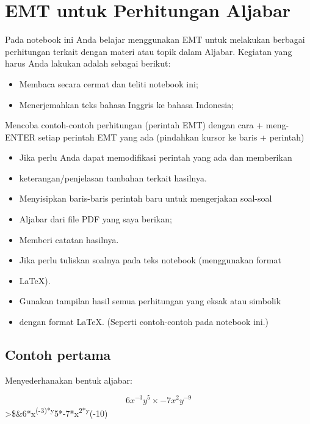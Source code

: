\documentclass[
]{book}
\author{}
\date{}
\begin{document}
\frontmatter

\mainmatter
\chapter{EMT untuk Perhitungan Aljabar}\label{emt-untuk-perhitungan-aljabar}

Pada notebook ini Anda belajar menggunakan EMT untuk melakukan berbagai perhitungan terkait dengan materi atau topik dalam Aljabar. Kegiatan yang harus Anda lakukan adalah sebagai berikut:

\begin{itemize}
\item
  Membaca secara cermat dan teliti notebook ini;
\item
  Menerjemahkan teks bahasa Inggris ke bahasa Indonesia;
\end{itemize}

Mencoba contoh-contoh perhitungan (perintah EMT) dengan cara + meng-ENTER setiap perintah EMT yang ada (pindahkan kursor ke baris + perintah)

\begin{itemize}
\item
  Jika perlu Anda dapat memodifikasi perintah yang ada dan memberikan
\item
  keterangan/penjelasan tambahan terkait hasilnya.
\item
  Menyisipkan baris-baris perintah baru untuk mengerjakan soal-soal
\item
  Aljabar dari file PDF yang saya berikan;
\item
  Memberi catatan hasilnya.
\item
  Jika perlu tuliskan soalnya pada teks notebook (menggunakan format
\item
  LaTeX).
\item
  Gunakan tampilan hasil semua perhitungan yang eksak atau simbolik
\item
  dengan format LaTeX. (Seperti contoh-contoh pada notebook ini.)
\end{itemize}

\section{Contoh pertama}\label{contoh-pertama}

Menyederhanakan bentuk aljabar:

\[6x^{-3}y^5\times -7x^2y^{-9}\]\textgreater\$\&6*x\textsuperscript{(-3)*y}5*-7*x\textsuperscript{2*y}(-10)
\end{document}
